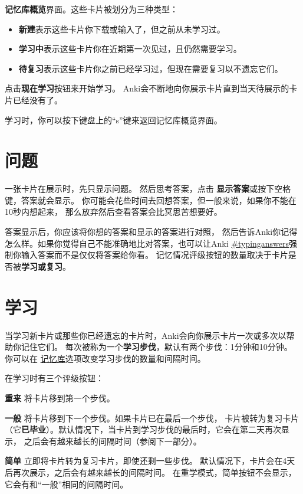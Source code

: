 \documentclass[a4paper]{book}
\begin{document}
	\textbf{记忆库概览}界面。这些卡片被划分为三种类型：
	
	\begin{itemize}
		\itemsep1pt\parskip0pt
		\item \textbf{新建}表示这些卡片你下载或输入了，但之前从未学习过。
		\item \textbf{学习中}表示这些卡片你在近期第一次见过，且仍然需要学习。
		\item \textbf{待复习}表示这些卡片你之前已经学习过，但现在需要复习以不遗忘它们。
	\end{itemize}
	
	点击\textbf{现在学习}按钮来开始学习。 Anki会不断地向你展示卡片直到当天待展示的卡片已经没有了。
	
	学习时，你可以按下键盘上的“s”键来返回记忆库概览界面。
	
	\section{问题}
	
	一张卡片在展示时，先只显示问题。 然后思考答案，点击
	\textbf{显示答案}或按下空格键，答案就会显示。 你可能会花些时间去回想答案，但一般来说，如果你不能在10秒内想起来， 那么放弃然后查看答案会比冥思苦想要好。
	
	答案显示后，你应该将你想的答案和显示的答案进行对照， 然后告诉Anki你记得怎么样。如果你觉得自己不能准确地比对答案，也可以让Anki
	\url{#typinganswers}强制你输入答案而不是仅仅将答案给你看。
	记忆情况评级按钮的数量取决于卡片是否被\textbf{学习或复习}。
	
	\section{学习}\label{studydeck}
	
	当学习新卡片或那些你已经遗忘的卡片时，Anki会向你展示卡片一次或多次以帮助你记住它们。 每次被称为一个\textbf{学习步伐}，默认有两个步伐：1分钟和10分钟。 你可以在
	\hyperref[deckoptions]{记忆库}选项改变学习步伐的数量和间隔时间。
	
	在学习时有三个评级按钮：
	
	\textbf{重来} 将卡片移到第一个步伐。
	
	\textbf{一般} 将卡片移到下一个步伐。如果卡片已在最后一个步伐， 卡片被转为复习卡片（它\textbf{已毕业}）。默认情况下，当卡片到学习步伐的最后时，它会在第二天再次显示， 之后会有越来越长的间隔时间（参阅下一部分）。
	
	\textbf{简单} 立即将卡片转为复习卡片，即使还剩一些步伐。 默认情况下，卡片会在4天后再次展示，之后会有越来越长的间隔时间。 在重学模式，简单按钮不会显示，它会有和“一般”相同的间隔时间。
	
\end{document}
